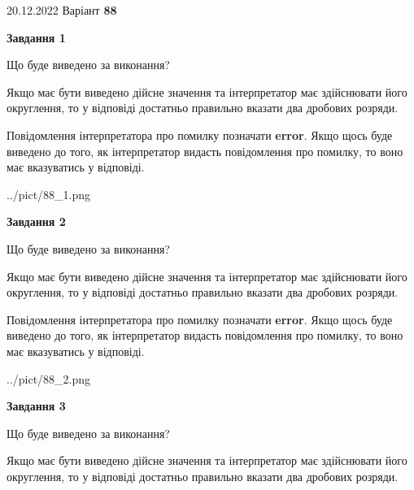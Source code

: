 \documentclass[12pt, ukrainian]{article}
\begin{document}
{20.12.2022 Варіант \No \textbf { 88 }\par}
{
\begin {Large}

{\begin {center}\textbf{Завдання 1}\end {center}}\par
Що буде виведено за виконання? \par

Якщо має бути виведено дійсне значення та інтерпретатор має здійснювати його округлення, 
то у відповіді достатньо правильно вказати два дробових розряди.

Повідомлення інтерпретатора про помилку позначати \textbf{error}.
Якщо щось буде виведено до того, як інтерпретатор видасть повідомлення про помилку, 
то воно має вказуватись у відповіді. \par

\begin{center}
	{../pict/88_1.png}
\end{center}
\newpage

{\begin {center}\textbf{Завдання 2}\end {center}}\par
Що буде виведено за виконання? \par

Якщо має бути виведено дійсне значення та інтерпретатор має здійснювати його округлення, 
то у відповіді достатньо правильно вказати два дробових розряди.

Повідомлення інтерпретатора про помилку позначати \textbf{error}.
Якщо щось буде виведено до того, як інтерпретатор видасть повідомлення про помилку, 
то воно має вказуватись у відповіді. \par

\begin{center}
	{../pict/88_2.png}
\end{center}
\newpage

{\begin {center}\textbf{Завдання 3}\end {center}}\par
Що буде виведено за виконання? \par

Якщо має бути виведено дійсне значення та інтерпретатор має здійснювати його округлення, 
то у відповіді достатньо правильно вказати два дробових розряди.


\end{Large}}
\end{document}
